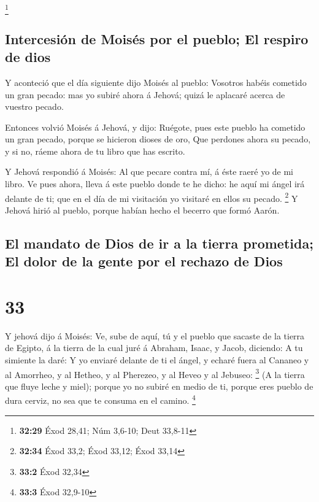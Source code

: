 \footnote{\textbf{32:29} Éxod 28,41; Núm 3,6-10; Deut 33,8-11}

\hypertarget{intercesiuxf3n-de-moisuxe9s-por-el-pueblo-el-respiro-de-dios}{%
\subsection{Intercesión de Moisés por el pueblo; El respiro de
dios}\label{intercesiuxf3n-de-moisuxe9s-por-el-pueblo-el-respiro-de-dios}}

 Y aconteció que el día siguiente dijo Moisés al pueblo:
Vosotros habéis cometido un gran pecado: mas yo subiré ahora á Jehová;
quizá le aplacaré acerca de vuestro pecado.

 Entonces volvió Moisés á Jehová, y dijo: Ruégote, pues
este pueblo ha cometido un gran pecado, porque se hicieron dioses de
oro,  Que perdones ahora su pecado, y si no, ráeme ahora de
tu libro que has escrito.

 Y Jehová respondió á Moisés: Al que pecare contra mí, á
éste raeré yo de mi libro.  Ve pues ahora, lleva á este
pueblo donde te he dicho: he aquí mi ángel irá delante de ti; que en el
día de mi visitación yo visitaré en ellos su pecado. \footnote{\textbf{32:34}
  Éxod 33,2; Éxod 33,12; Éxod 33,14}  Y Jehová hirió al
pueblo, porque habían hecho el becerro que formó Aarón.

\hypertarget{el-mandato-de-dios-de-ir-a-la-tierra-prometida-el-dolor-de-la-gente-por-el-rechazo-de-dios}{%
\subsection{El mandato de Dios de ir a la tierra prometida; El dolor de
la gente por el rechazo de
Dios}\label{el-mandato-de-dios-de-ir-a-la-tierra-prometida-el-dolor-de-la-gente-por-el-rechazo-de-dios}}

\hypertarget{section-32}{%
\section{33}\label{section-32}}

 Y jehová dijo á Moisés: Ve, sube de aquí, tú y el pueblo
que sacaste de la tierra de Egipto, á la tierra de la cual juré á
Abraham, Isaac, y Jacob, diciendo: A tu simiente la daré:  Y
yo enviaré delante de ti el ángel, y echaré fuera al Cananeo y al
Amorrheo, y al Hetheo, y al Pherezeo, y al Heveo y al Jebuseo:
\footnote{\textbf{33:2} Éxod 32,34}  (A la tierra que fluye
leche y miel); porque yo no subiré en medio de ti, porque eres pueblo de
dura cerviz, no sea que te consuma en el camino. \footnote{\textbf{33:3}
  Éxod 32,9-10}

